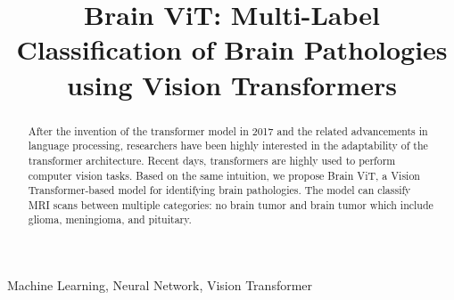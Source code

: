 \documentclass[conference]{IEEEtran}
\begin{document}
\title{Brain ViT: Multi-Label Classification of Brain Pathologies using Vision Transformers \\
}

\author{
\and
{}
\and
{}
\and
{}
\and
{}
\and
{}
}

\maketitle

\begin{abstract}
After the invention of the transformer model in 2017 and the related advancements in language processing, researchers have been highly interested in the adaptability of the transformer architecture. Recent days, transformers are highly used to perform computer vision tasks. Based on the same intuition, we propose Brain ViT, a Vision Transformer-based model for identifying brain pathologies. The model can classify MRI scans between multiple categories: no brain tumor and brain tumor which include glioma, meningioma, and pituitary.

\end{abstract}

\begin{IEEEkeywords}
Machine Learning, Neural Network, Vision Transformer
\end{IEEEkeywords}
\end{document}

